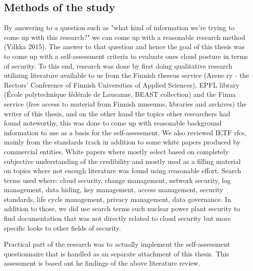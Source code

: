\documentclass{article}
\begin{document}
\subsection{Methods of the study}
By answering to a question such as "what kind of information we're trying to come up with this research?" we can come up with a reasonable research method (Vilkka 2015).
The answer to that question and hence the goal of this thesis was to come up with a self-assessment criteria to evaluate ones cloud posture in terms of security.
To this end, research was done by first doing qualitative research utilizing literature available to us from the Finnish theseus service (Arene ry - the Rectors' Conference of Finnish Universities of Applied Sciences), EPFL library (École polytechnique fédérale de Lausanne, BEAST collection) and the Finna service (free access to material from Finnish museums, libraries and archives) the writer of this thesis, and on the other hand the topics other researchers had found noteworthy, this was done to come up with reasonable background information to use as a basis for the self-assessment. We also reviewed IETF rfcs, mainly from the standards track in addition to some white papers produced by commercial entities. White papers where mostly select based on completely subjective understanding of the credibility and mostly used as a filling material on topics where not enough literature was found using reasonable effort. Search terms used where: cloud security, change management, network security, log management, data hiding, key management, access management, security standards, life cycle management, privacy management, data governance. In addition to those, we did use search terms such nuclear power plant security to find documentation that was not directly related to cloud security but more specific looks to other fields of security.
\par
Practical part of the research was to actually implement the self-assessment questionnaire that is handled as an separate attachment of this thesis. This assessment is based ont he findings of the above literature review.
\end{document}
